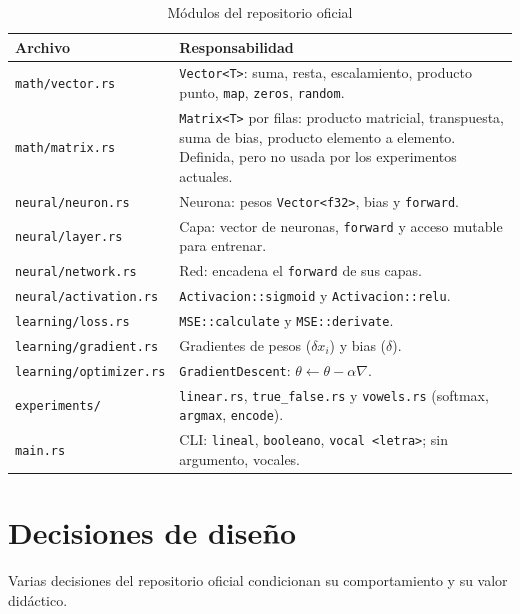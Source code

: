 \begin{table}[!htbp]
\caption{Módulos del repositorio oficial}\label{tab:arquitectura}
\small
\begin{tabularx}{\textwidth}{@{}l >{\raggedright\arraybackslash}X@{}}
\toprule
Archivo & Responsabilidad \\
\midrule
\texttt{math/vector.rs} & \texttt{Vector<T>}: suma, resta, escalamiento, producto punto, \texttt{map}, \texttt{zeros}, \texttt{random}. \\
\texttt{math/matrix.rs} & \texttt{Matrix<T>} por filas: producto matricial, transpuesta, suma de bias, producto elemento a elemento. Definida, pero no usada por los experimentos actuales. \\
\texttt{neural/neuron.rs} & Neurona: pesos \texttt{Vector<f32>}, bias y \texttt{forward}. \\
\texttt{neural/layer.rs} & Capa: vector de neuronas, \texttt{forward} y acceso mutable para entrenar. \\
\texttt{neural/network.rs} & Red: encadena el \texttt{forward} de sus capas. \\
\texttt{neural/activation.rs} & \texttt{Activacion::sigmoid} y \texttt{Activacion::relu}. \\
\texttt{learning/loss.rs} & \texttt{MSE::calculate} y \texttt{MSE::derivate}. \\
\texttt{learning/gradient.rs} & Gradientes de pesos ($\delta x_i$) y bias ($\delta$). \\
\texttt{learning/optimizer.rs} & \texttt{GradientDescent}: $\theta\leftarrow\theta-\alpha\nabla$. \\
\texttt{experiments/} & \texttt{linear.rs}, \texttt{true\_false.rs} y \texttt{vowels.rs} (softmax, \texttt{argmax}, \texttt{encode}). \\
\texttt{main.rs} & CLI: \texttt{lineal}, \texttt{booleano}, \texttt{vocal <letra>}; sin argumento, vocales. \\
\bottomrule
\end{tabularx}
\end{table}

\section{Decisiones de diseño}
Varias decisiones del repositorio oficial condicionan su comportamiento y su valor didáctico.

